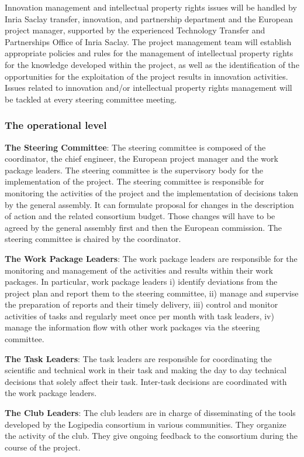 Innovation management and intellectual property rights issues will be
handled by Inria Saclay transfer, innovation, and partnership
department and the European project manager, supported by the
experienced Technology Transfer and Partnerships Office of Inria
Saclay. The project management team will establish appropriate
policies and rules for the management of intellectual property rights
for the knowledge developed within the project, as well as the
identification of the opportunities for the exploitation of the
project results in innovation activities. Issues related to innovation
and/or intellectual property rights management will be tackled at
every steering committee meeting.

\subsubsection*{The operational level}

\begin{compactitem}
\item{\bf The Steering Committee}: The steering committee is composed of
the coordinator, the chief engineer, the European project
manager and the work package leaders. The steering committee is the
supervisory body for the implementation of the project. The steering
committee is responsible for monitoring the activities of the project
and the implementation of decisions taken by the general assembly. It
can formulate proposal for changes in the description of action and
the related consortium budget. Those changes will have to be agreed
by the general assembly first and then the European
commission. The steering committee is chaired by the 
coordinator.

\item{\bf The Work Package Leaders}: The work package leaders are
responsible for the monitoring and management of the activities and
results within their work packages. In particular, work package
leaders i) identify deviations from the project plan and report them
to the steering committee, ii) manage and supervise the preparation of
reports and their timely delivery, iii) control and monitor activities
of tasks and regularly meet once per month with task leaders, iv)
manage the information flow with other work packages via the steering
committee.

\item{\bf The Task Leaders}: The task leaders are responsible for
coordinating the scientific and technical work in their task and
making the day to day technical decisions that solely affect their
task. Inter-task decisions are coordinated with the work package
leaders.

\item{\bf The Club Leaders}: The club leaders are in charge of
disseminating of the tools developed by the Logipedia consortium in
various communities. They organize the activity of the club. They give
ongoing feedback to the consortium during the course of the project.
\end{compactitem}

